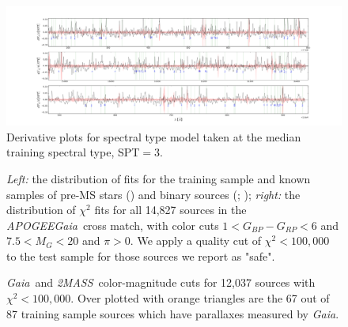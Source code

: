 \documentclass[modern]{aastex62}
\newcommand{\apogee}{\textsl{APOGEE}}
\newcommand{\gaia}{\textsl{Gaia}}
\newcommand{\zmass}{\textsl{2MASS}}
\begin{document}
\begin{figure}[ht]
\begin{center}
\includegraphics[width=16cm]{figures/derivative_jackknife_spt.png}
\end{center}
\caption{Derivative plots for spectral type model taken at the median training spectral type, SPT$=3$.} \label{fig:west_derivative}
\end{figure}


\begin{figure}[ht]
\caption{\textit{Left:} the distribution of fits for the training sample and known samples of pre-MS stars (\citealt{Cottaar:2014}) and binary sources (\citealt{ElBadry:2018}; \citealt{Skinner:2018}); \textit{right:} the distribution of $\chi^2$ fits for all 14,827 sources in the \apogee\-\gaia\ cross match, with color cuts $1<G_{BP}-G_{RP}<6$ and $7.5<M_{G}<20$ and $\pi>0$. We apply a quality cut of $\chi^2 < 100,000$ to the test sample for those sources we report as "safe". \label{fig:chi_dist}}
\end{figure}

\begin{figure}[ht]
\caption{\gaia\ and \zmass\ color-magnitude cuts for 12,037 sources with $\chi^2<100,000$. Over plotted with orange triangles are the 67 out of 87 training sample sources which have parallaxes measured by \gaia. \label{fig:cmd_selection}}
\end{figure}
\end{document}
